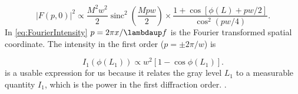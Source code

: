 \begin{equation}\label{eq:FourierIntensity}
    |F(p,0)|^2\propto
    \frac{M^2 w^2}{2}\operatorname{sinc}^2\left(\frac{M p w}{2}\right) \times
    \frac{1 + \cos{\left[\phi(L)+p w/2\right]}}{\cos^2(p w/4)}.
\end{equation}
In \cref{eq:FourierIntensity} $p=2\pi x/\lambdaup f$ is the Fourier transformed spatial coordinate. 
The intensity in the first order ($p=\pm 2\pi/w$) is

\begin{equation}\label{eq:IntensityFirstOrderAppendix}
    I_1(\phi(L_1)) \propto
   w^2 \left[ 
    1-\cos{\phi(L_1)}
    \right].
\end{equation}
 is a usable expression for us because it relates the gray level $L_1$ to a measurable quantity $I_1$, which is the power in the first diffraction order. .